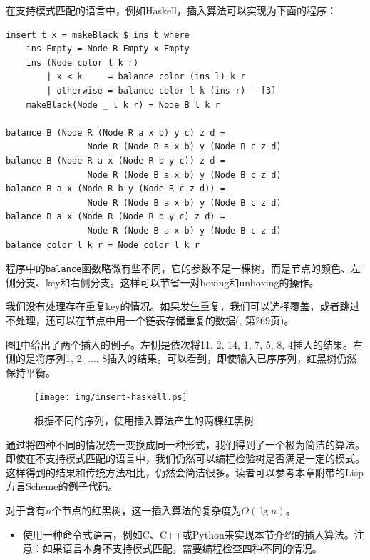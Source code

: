 \documentclass[b5paper]{ctexart}
\begin{document}
在支持模式匹配的语言中，例如Haskell，插入算法可以实现为下面的程序：

\lstset{language=Haskell}
\begin{lstlisting}[style=Haskell]
insert t x = makeBlack $ ins t where
    ins Empty = Node R Empty x Empty
    ins (Node color l k r)
        | x < k     = balance color (ins l) k r
        | otherwise = balance color l k (ins r) --[3]
    makeBlack(Node _ l k r) = Node B l k r

balance B (Node R (Node R a x b) y c) z d =
                Node R (Node B a x b) y (Node B c z d)
balance B (Node R a x (Node R b y c)) z d =
                Node R (Node B a x b) y (Node B c z d)
balance B a x (Node R b y (Node R c z d)) =
                Node R (Node B a x b) y (Node B c z d)
balance B a x (Node R (Node R b y c) z d) =
                Node R (Node B a x b) y (Node B c z d)
balance color l k r = Node color l k r
\end{lstlisting} %

程序中的\texttt{balance}函数略微有些不同，它的参数不是一棵树，而是节点的颜色、左侧分支、key和右侧分支。这样可以节省一对boxing和unboxing的操作。

我们没有处理存在重复key的情况。如果发生重复，我们可以选择覆盖，或者跳过不处理，还可以在节点中用一个链表存储重复的数据(\cite{CLRS}, 第269页)。

图\ref{fig:insert-example}中给出了两个插入的例子。左侧是依次将11, 2, 14, 1, 7, 5, 8, 4插入的结果。右侧的是将序列1, 2, ..., 8插入的结果。可以看到，即使输入已序序列，红黑树仍然保持平衡。

\begin{figure}[htbp]
  \centering
  \texttt{[image: img/insert-haskell.ps]}
  \caption{根据不同的序列，使用插入算法产生的两棵红黑树} \label{fig:insert-example}
\end{figure}

通过将四种不同的情况统一变换成同一种形式，我们得到了一个极为简洁的算法。即使在不支持模式匹配的语言中，我们仍然可以编程检验树是否满足一定的模式。这样得到的结果和传统方法相比，仍然会简洁很多。读者可以参考本章附带的Lisp方言Scheme的例子代码。

对于含有$n$个节点的红黑树，这一插入算法的复杂度为$O(\lg n)$。

\begin{Exercise}

\begin{itemize}
\item 使用一种命令式语言，例如C、C++或Python来实现本节介绍的插入算法。注意：如果语言本身不支持模式匹配，需要编程检查四种不同的情况。
\end{itemize}

\end{Exercise}
\end{document}
